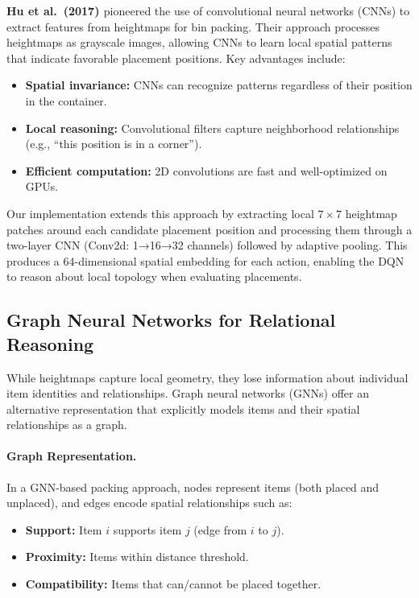 \textbf{Hu et al.\ (2017) \cite{HLZ17}} pioneered the use of convolutional neural networks (CNNs) to extract features from heightmaps for bin packing. Their approach processes heightmaps as grayscale images, allowing CNNs to learn local spatial patterns that indicate favorable placement positions. Key advantages include:
\begin{itemize}
\item \textbf{Spatial invariance:} CNNs can recognize patterns regardless of their position in the container.
\item \textbf{Local reasoning:} Convolutional filters capture neighborhood relationships (e.g., ``this position is in a corner'').
\item \textbf{Efficient computation:} 2D convolutions are fast and well-optimized on GPUs.
\end{itemize}

Our implementation extends this approach by extracting local $7 \times 7$ heightmap patches around each candidate placement position and processing them through a two-layer CNN (Conv2d: 1→16→32 channels) followed by adaptive pooling. This produces a 64-dimensional spatial embedding for each action, enabling the DQN to reason about local topology when evaluating placements.

\subsection{Graph Neural Networks for Relational Reasoning}

While heightmaps capture local geometry, they lose information about individual item identities and relationships. Graph neural networks (GNNs) offer an alternative representation that explicitly models items and their spatial relationships as a graph.

\paragraph{Graph Representation.}
In a GNN-based packing approach, nodes represent items (both placed and unplaced), and edges encode spatial relationships such as:
\begin{itemize}
\item \textbf{Support:} Item $i$ supports item $j$ (edge from $i$ to $j$).
\item \textbf{Proximity:} Items within distance threshold.
\item \textbf{Compatibility:} Items that can/cannot be placed together.
\end{itemize}

